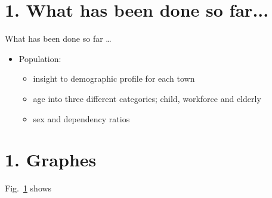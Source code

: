 \documentclass[xcolor=dvipsnames]{beamer}
\begin{document}
	
\section{1. What has been done so far...}
		\begin{frame}{\vskip 0.05cm\centerline{\Huge\textcolor{bscuro}{What has been done so far \ldots}}}
		\begin{itemize}
		\item Population: 
					\begin{itemize}
						\item insight to demographic profile for each town 
						\item age into three different categories; child, workforce and elderly
						\item sex and dependency ratios 
					\end{itemize}
		\end{itemize}
\end{frame}


\section{1. Graphes}
		\begin{frame}
		Fig.~\ref{fig1} shows 
			\begin{figure}[!ht] 
				\centering
				\qquad
				\caption{} 
				\label{fig1}
			\end{figure}
		\end{frame}
\end{document}
